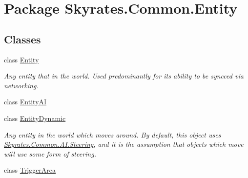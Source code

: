 \hypertarget{namespace_skyrates_1_1_common_1_1_entity}{\section{Package Skyrates.\-Common.\-Entity}
\label{namespace_skyrates_1_1_common_1_1_entity}
}
\subsection*{Classes}
\begin{DoxyCompactItemize}
\item 
class \hyperlink{class_skyrates_1_1_common_1_1_entity_1_1_entity}{Entity}
\begin{DoxyCompactList}\small\item\em Any entity that in the world. Used predominantly for its ability to be syncced via networking. \end{DoxyCompactList}\item 
class \hyperlink{class_skyrates_1_1_common_1_1_entity_1_1_entity_a_i}{Entity\-A\-I}
\item 
class \hyperlink{class_skyrates_1_1_common_1_1_entity_1_1_entity_dynamic}{Entity\-Dynamic}
\begin{DoxyCompactList}\small\item\em Any entity in the world which moves around. By default, this object uses \hyperlink{class_skyrates_1_1_common_1_1_a_i_1_1_steering}{Skyrates.\-Common.\-A\-I.\-Steering}, and it is the assumption that objects which move will use some form of steering. \end{DoxyCompactList}\item 
class \hyperlink{class_skyrates_1_1_common_1_1_entity_1_1_trigger_area}{Trigger\-Area}
\end{DoxyCompactItemize}
